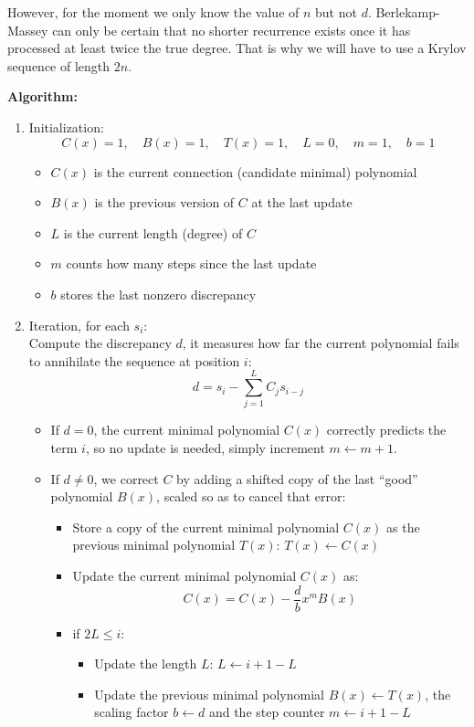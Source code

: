 \documentclass[a4paper, 11pt]{article}
\begin{document}
However, for the moment we only know the value of $n$ but not $d$. Berlekamp-Massey can only be certain that no shorter recurrence exists once it has processed at least twice the true degree. That is why we will have to use a Krylov sequence of length $2n$.

\textbf{Algorithm:}

\begin{enumerate}
    \item Initialization:
    $$C(x)=1, \quad B(x) = 1, \quad T(x) = 1, \quad L = 0, \quad m = 1, \quad b = 1$$
    \begin{itemize}
        \item $C(x)$ is the current connection (candidate minimal) polynomial
        \item $B(x)$ is the previous version of $C$ at the last update
        \item $L$ is the current length (degree) of $C$
        \item $m$ counts how many steps since the last update
        \item $b$ stores the last nonzero discrepancy
    \end{itemize}
    \item Iteration, for each $s_i$: \\
    Compute the discrepancy $d$, it measures how far the current polynomial fails to annihilate the sequence at position $i$:
        $$d = s_i - \sum^L_{j=1}C_j s_{i-j}$$
    \begin{itemize}
        \item If $d=0$, the current minimal polynomial $C(x)$ correctly predicts the term $i$, so no update is needed, simply increment $m \leftarrow m + 1$.
        \item If $d \neq 0$, we correct $C$ by adding a shifted copy of the last “good” polynomial $B(x)$, scaled so as to cancel that error:
        \begin{itemize}
            \item Store a copy of the current minimal polynomial $C(x)$ as the previous minimal polynomial $T(x)$: $T(x) \leftarrow C(x)$
            \item Update the current minimal polynomial $C(x)$ as: $$C(x)=C(x)-\frac{d}{b}x^mB(x)$$
            \item if $2L \leq i$:
            \begin{itemize}
                \item Update the length $L$: $L\leftarrow i+1-L$
                \item Update the previous minimal polynomial $B(x) \leftarrow T(x)$, the scaling factor $b \leftarrow d$ and the step counter $m \leftarrow i + 1 - L$
            \end{itemize}
        \end{itemize}
    \end{itemize}
\end{enumerate}
\end{document}
